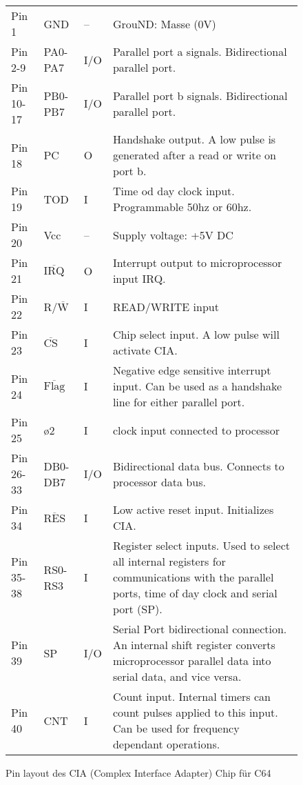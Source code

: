 \documentclass[a4paper]{article}
\begin{document}
\newpage
\begin{figure}[h]
  \centering
\begin{minipage}[t]{.45\columnwidth} 
\end{minipage}\hfill
\begin{minipage}[t]{.45\columnwidth} 
{\scriptsize
\begin{tabular}{lllp{4cm}}
Pin 1 &GND &-- &GrouND: Masse (0V) \\
Pin 2-9 &PA0-PA7  &I/O  &Parallel port a signals. Bidirectional parallel port. \\
Pin 10-17 &PB0-PB7  &I/O &Parallel port b signals. Bidirectional parallel port. \\
Pin 18 &PC &O &Handshake output. A low pulse is generated after a read or write on port b. \\
Pin 19 &TOD &I &Time od day clock input. Programmable 50hz or 60hz. \\
Pin 20 &Vcc &--&Supply voltage: +5V DC \\
Pin 21 &$\overline{\mathrm{IRQ}}$ &O &Interrupt output to microprocessor input IRQ. \\
Pin 22 &R/$\overline{\mathrm{W}}$ &I &READ/WRITE input \\
Pin 23 &$\overline{\mathrm{CS}}$ &I &Chip select input. A low pulse will activate CIA. \\
Pin 24 &$\overline{\mathrm{Flag}}$ &I &Negative edge sensitive interrupt input. Can be used as a handshake line for either parallel port. \\
Pin 25 &{\o}2 &I &clock input connected to processor \\
Pin 26-33 &DB0-DB7  &I/O &Bidirectional data bus. Connects to processor data bus. \\
Pin 34 &$\overline{\mathrm{RES}}$ &I &Low active reset input. Initializes CIA. \\
Pin 35-38  &RS0-RS3  &I &Register select inputs. Used to select all internal registers for communications with the parallel ports, time of day clock and serial port (SP). \\
Pin 39 &SP &I/O &Serial Port bidirectional connection. An internal shift register converts microprocessor parallel data into serial data, and vice versa. \\
Pin 40 &CNT &I &Count input. Internal timers can count pulses applied to this input. Can be used for frequency dependant operations.

\end{tabular}
}
\end{minipage}
  \caption{Pin layout des CIA (Complex Interface Adapter) Chip für C64}
  \label{fig:cia}
\end{figure}
\end{document}
